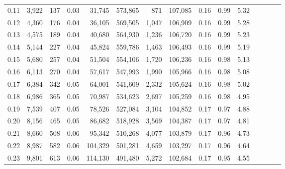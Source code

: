 \begin{tabular}{rrrcrrrrrrrrrrr}
0.11 &   3,922 &    137 &                                       0.03 &   31,745 &  573,865 &      871 &  107,085 &  0.16 &  0.99 &                         5.32 \\
0.12 &   4,360 &    176 &                                       0.04 &   36,105 &  569,505 &    1,047 &  106,909 &  0.16 &  0.99 &                         5.28 \\
0.13 &   4,575 &    189 &                                       0.04 &   40,680 &  564,930 &    1,236 &  106,720 &  0.16 &  0.99 &                         5.23 \\
0.14 &   5,144 &    227 &                                       0.04 &   45,824 &  559,786 &    1,463 &  106,493 &  0.16 &  0.99 &                         5.19 \\
0.15 &   5,680 &    257 &                                       0.04 &   51,504 &  554,106 &    1,720 &  106,236 &  0.16 &  0.98 &                         5.13 \\
0.16 &   6,113 &    270 &                                       0.04 &   57,617 &  547,993 &    1,990 &  105,966 &  0.16 &  0.98 &                         5.08 \\
0.17 &   6,384 &    342 &                                       0.05 &   64,001 &  541,609 &    2,332 &  105,624 &  0.16 &  0.98 &                         5.02 \\
0.18 &   6,986 &    365 &                                       0.05 &   70,987 &  534,623 &    2,697 &  105,259 &  0.16 &  0.98 &                         4.95 \\
0.19 &   7,539 &    407 &                                       0.05 &   78,526 &  527,084 &    3,104 &  104,852 &  0.17 &  0.97 &                         4.88 \\
0.20 &   8,156 &    465 &                                       0.05 &   86,682 &  518,928 &    3,569 &  104,387 &  0.17 &  0.97 &                         4.81 \\
0.21 &   8,660 &    508 &                                       0.06 &   95,342 &  510,268 &    4,077 &  103,879 &  0.17 &  0.96 &                         4.73 \\
0.22 &   8,987 &    582 &                                       0.06 &  104,329 &  501,281 &    4,659 &  103,297 &  0.17 &  0.96 &                         4.64 \\
0.23 &   9,801 &    613 &                                       0.06 &  114,130 &  491,480 &    5,272 &  102,684 &  0.17 &  0.95 &                         4.55 \\

\end{tabular}
